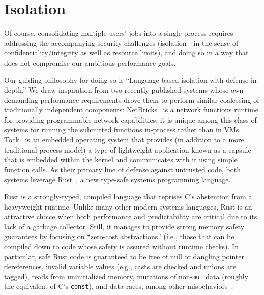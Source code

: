 \section{Isolation}
\label{sec:isolation}


Of course, consolidating multiple users' jobs into a single process requires
addressing the accompanying security challenges (isolation---in the sense of
confidentiality/integrity as well as resource limits), and doing so in a way that
does not compromise our ambitious performance goals.

Our guiding philosophy for doing so is ``Language-based isolation with defense in depth.''
We draw inspiration from two recently-published systems whose own demanding
performance requirements drove them to perform similar coalescing of traditionally
independent components:  NetBricks~\cite{Panda2016} is a network functions runtime
for providing programmable network capabilities; it is unique among this class of
systems for running the submitted functions in-process rather than in VMs.
Tock~\cite{Levy2017} is an embedded operating system that provides (in addition to a
more traditional process model) a type of lightweight application known as a capsule
that is embedded within the kernel and communicates with it using simple function
calls.  As their primary line of defense against untrusted code, both systems
leverage Rust~\cite{www-rustlang}, a new type-safe systems programming language.

Rust is a strongly-typed, compiled language that reprises C's abstention from a
heavyweight runtime.  Unlike many other modern systems languages, Rust is an
attractive choice when both performance and predictability are critical due to its
lack of a garbage collector.  Still, it manages to provide strong memory safety
guarantees by focusing on ``zero-cost abstractions'' (i.e., those that can be
compiled down to code whose safety is assured without runtime checks).  In
particular, safe Rust code is guaranteed to be free of null or dangling pointer
dereferences, invalid variable values (e.g., casts are checked and unions are
tagged), reads from uninitialized memory, mutations of non-\texttt{mut} data (roughly
the equivalent of C's \texttt{const}), and data races, among other
misbehaviors~\cite{www-rustlang-ub}.

